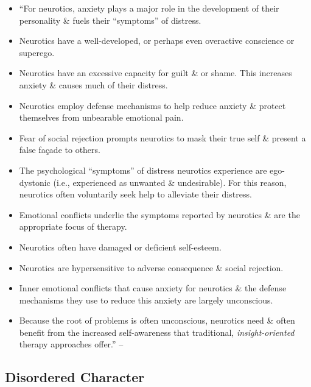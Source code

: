 \documentclass{article}
\numberwithin{equation}{section}
\begin{document}
\begin{itemize}
	\item ``For neurotics, anxiety plays a major role in the development of their personality \& fuels their ``symptoms'' of distress.
	\item Neurotics have a well-developed, or perhaps even overactive conscience or superego.
	\item Neurotics have an excessive capacity for guilt \& or shame. This increases anxiety \& causes much of their distress.
	\item Neurotics employ defense mechanisms to help reduce anxiety \& protect themselves from unbearable emotional pain.
	\item Fear of social rejection prompts neurotics to mask their true self \& present a false fa\c{c}ade to others.
	\item The psychological ``symptoms'' of distress neurotics experience are ego-dystonic (i.e., experienced as unwanted \& undesirable). For this reason, neurotics often voluntarily seek help to alleviate their distress.
	\item Emotional conflicts underlie the symptoms reported by neurotics \& are the appropriate focus of therapy.
	\item Neurotics often have damaged or deficient self-esteem.
	\item Neurotics are hypersensitive to adverse consequence \& social rejection.
	\item Inner emotional conflicts that cause anxiety for neurotics \& the defense mechanisms they use to reduce this anxiety are largely unconscious.
	\item Because the root of problems is often unconscious, neurotics need \& often benefit from the increased self-awareness that traditional, \textit{insight-oriented} therapy approaches offer.'' -- \cite[pp. 31--32]{Simon2010}
\end{itemize}

\subsection{Disordered Character}
\end{document}
